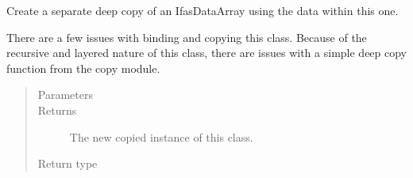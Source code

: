 \documentclass[letterpaper,10pt,english]{sphinxmanual}
\begin{document}
\begin{fulllineitems}

\begin{fulllineitems}
\label{\detokenize{python_docstrings/IfA_Smeargle.zulu.zulu_main:IfA_Smeargle.zulu.zulu_main.IfasDataArray.data}}
\end{fulllineitems}


\begin{fulllineitems}
\label{\detokenize{python_docstrings/IfA_Smeargle.zulu.zulu_main:IfA_Smeargle.zulu.zulu_main.IfasDataArray.datamask}}
\end{fulllineitems}


\begin{fulllineitems}
\label{\detokenize{python_docstrings/IfA_Smeargle.zulu.zulu_main:IfA_Smeargle.zulu.zulu_main.IfasDataArray.deepcopy}}
Create a separate deep copy of an IfasDataArray using the data
within this one.

There are a few issues with binding and copying this class.
Because of the recursive and layered nature of this class, there
are issues with a simple deep copy function from the copy module.
\begin{quote}\begin{description}
\item[{Parameters}] \leavevmode
{} \textendash{} 

\item[{Returns}] \leavevmode
{} \textendash{} The new copied instance of this class.

\item[{Return type}] \leavevmode
{\hyperref[\detokenize{python_docstrings/IfA_Smeargle.zulu.zulu_main:IfA_Smeargle.zulu.zulu_main.IfasDataArray}]{}}


\end{description}
\end{quote}
\end{fulllineitems}
\end{fulllineitems}
\end{document}
